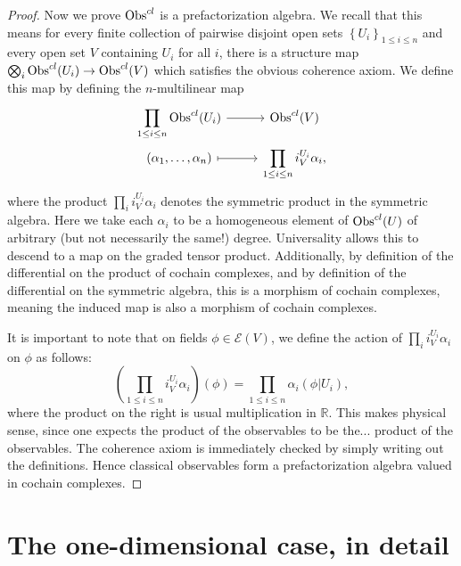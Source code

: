 \begin{proof}
	Now we prove $\operatorname{Obs}^{cl} $ is a prefactorization algebra. We recall that this means for every finite collection of pairwise disjoint open sets $\left\{ U_i \right\}_{1\leq i\leq n} $ and every open set $V$ containing $U_i$ for all $i$, there is a structure map $\bigotimes_{i} \operatorname{Obs}^{cl} (U_i) \to \operatorname{Obs}^{cl} (V)$ which satisfies the obvious coherence axiom. We define this map by defining the $n$-multilinear map
	\[\begin{tikzcd}[row sep = 0em, column sep = 2.5em]
		\displaystyle{\prod_{1\leq i\leq n} \Obs^{cl} (U_i)}\ar[r]  & \Obs^{cl} (V) \\
		(\alpha _1, \ldots ,\alpha _n)\ar[r, mapsto]  & \displaystyle{\prod_{1\leq i\leq n} i_{V}^{U_i} \alpha _i,}
	\end{tikzcd}\]
	where the product $\prod_{i} i_V^{U_i}\alpha _i$ denotes the symmetric product in the symmetric algebra. Here we take each $\alpha _i$ to be a homogeneous element of $\operatorname{Obs}^{cl} (U)$ of arbitrary (but not necessarily the same!) degree. Universality allows this to descend to a map on the graded tensor product. Additionally, by definition of the differential on the product of cochain complexes, and by definition of the differential on the symmetric algebra, this is a morphism of cochain complexes, meaning the induced map is also a morphism of cochain complexes.

	It is important to note that on fields $\phi \in \mathcal{E}(V)$, we define the action of $\prod_{i} i_V^{U_i}\alpha _i$ on $\phi $ as follows:
	\[
		\left( \prod_{1\leq i\leq n} i_{V} ^{U_i} \alpha _i \right) (\phi )=\prod_{1\leq i\leq n} \alpha _i(\phi |U_i),
	\]
	where the product on the right is usual multiplication in $\mathbb{R} $. This makes physical sense, since one expects the product of the observables to be the... product of the observables. The coherence axiom is immediately checked by simply writing out the definitions. Hence classical observables form a prefactorization algebra valued in cochain complexes.
\end{proof}
	





\section{The one-dimensional case, in detail}


